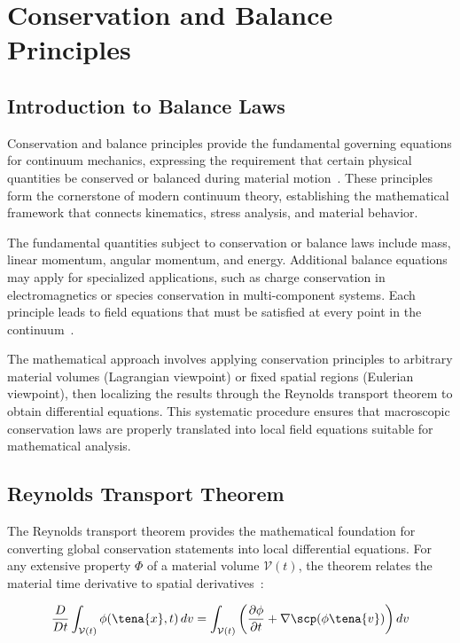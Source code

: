 \chapter{Conservation and Balance Principles}

\section{Introduction to Balance Laws}

Conservation and balance principles provide the fundamental governing equations for continuum mechanics, expressing the requirement that certain physical quantities be conserved or balanced during material motion~\autocite{Sadd.2019}. These principles form the cornerstone of modern continuum theory, establishing the mathematical framework that connects kinematics, stress analysis, and material behavior.

The fundamental quantities subject to conservation or balance laws include mass, linear momentum, angular momentum, and energy. Additional balance equations may apply for specialized applications, such as charge conservation in electromagnetics or species conservation in multi-component systems. Each principle leads to field equations that must be satisfied at every point in the continuum~\autocite{Sadd.2019}.

The mathematical approach involves applying conservation principles to arbitrary material volumes (Lagrangian viewpoint) or fixed spatial regions (Eulerian viewpoint), then localizing the results through the Reynolds transport theorem to obtain differential equations. This systematic procedure ensures that macroscopic conservation laws are properly translated into local field equations suitable for mathematical analysis.

\section{Reynolds Transport Theorem}

The Reynolds transport theorem provides the mathematical foundation for converting global conservation statements into local differential equations. For any extensive property $\Phi$ of a material volume $\mathcal{V}(t)$, the theorem relates the material time derivative to spatial derivatives~\autocite{Sadd.2019}:

\begin{equation}
\frac{D}{Dt}\int_{\mathcal{V}(t)} \phi(\tena{x}, t) \, dv = \int_{\mathcal{V}(t)} \left(\frac{\partial \phi}{\partial t} + \nabla \scp (\phi \tena{v})\right) dv
\end{equation}

